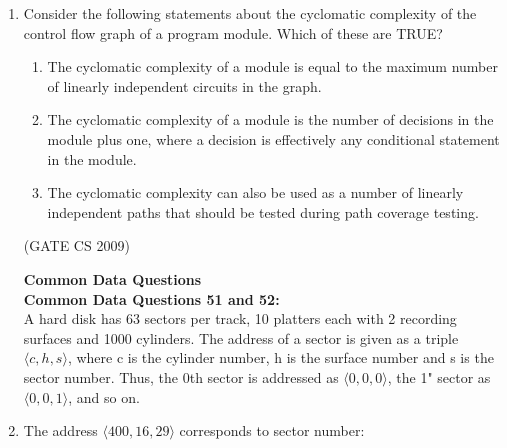 \documentclass[a4paper, 11pt]{article}
\begin{document}
\begin{enumerate}
    \item Consider the following statements about the cyclomatic complexity of the control flow graph of a program module. Which of these are TRUE?\\
    \begin{enumerate}[label=\Roman*]
        \item The cyclomatic complexity of a module is equal to the maximum number of linearly independent circuits in the graph.
        \item The cyclomatic complexity of a module is the number of decisions in the module plus one, where a decision is effectively any conditional statement in the module.
        \item The cyclomatic complexity can also be used as a number of linearly independent paths that should be tested during path coverage testing.
    \end{enumerate}
    \begin{enumerate}
    \end{enumerate}
    
    
    \hfill (GATE CS 2009)

    \textbf{{\LARGE Common Data Questions}} \\
    \large\textbf{Common Data Questions 51 and 52:}\\
    A hard disk has 63 sectors per track, 10 platters each with 2 recording surfaces and 1000 cylinders. The address of a sector is given as a triple $\langle c,h,s \rangle$, where c is the cylinder number, h is the surface number and s is the sector number. Thus, the 0th sector is addressed as $\langle 0,0,0 \rangle$, the 1" sector as $\langle 0,0,1 \rangle $, and so on.
    \item The address $\langle 400,16,29 \rangle$ corresponds to sector number:
    \begin{enumerate}
    \end{enumerate}
    

\end{enumerate}
\end{document}
